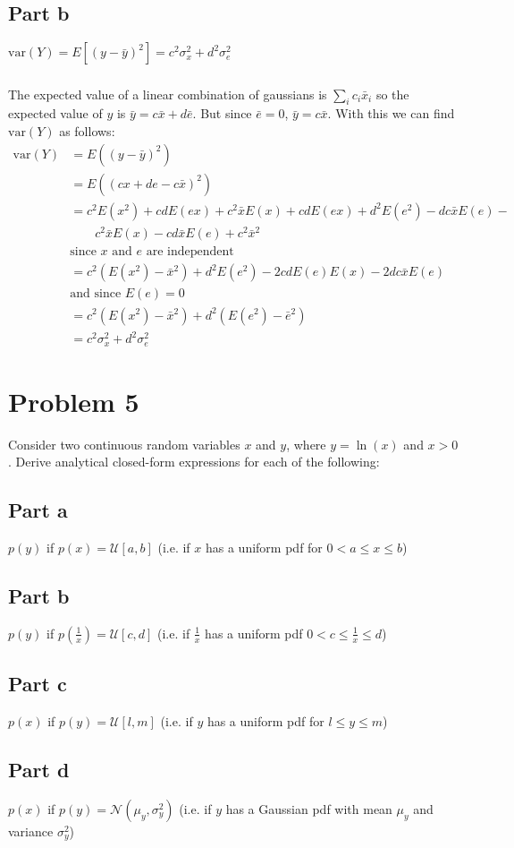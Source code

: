 \documentclass[11pt]{article}
\begin{document}
\subsection*{Part b}
$\text{var}(Y) = E[(y-\bar{y})^2]=c^2\sigma_x^2+d^2\sigma_e^2$

\subparagraph*{}
The expected value of a linear combination of gaussians is $\sum_i c_i\bar{x}_i$ so the expected value of $y$ is $\bar{y}=c\bar{x}+d\bar{e}$. But since $\bar{e}=0$, $\bar{y}=c\bar{x}$. With this we can find $\text{var}(Y)$ as follows:
\begin{align*}
	\text{var}(Y) &= E((y-\bar{y})^2) \\
	&= E((cx+de-c\bar{x})^2) \\
	&= c^2E(x^2)+cdE(ex)+c^2\bar{x}E(x)+cdE(ex)+d^2E(e^2)-dc\bar{x}E(e)-\\
	&\qquad c^2\bar{x}E(x)-cd\bar{x}E(e)+c^2\bar{x}^2 \\
	& \text{since $x$ and $e$ are independent} \\
	&= c^2(E(x^2)-\bar{x}^2)+d^2E(e^2)-2cdE(e)E(x)-2dc\bar{x}E(e)\\
	& \text{and since $E(e)=0$} \\
	&= c^2(E(x^2)-\bar x^2) + d^2(E(e^2) - \bar{e}^2) \\
	&= c^2\sigma_x^2 + d^2\sigma_e^2
\end{align*}

\section*{Problem 5}
Consider two continuous random variables $x$ and $y$, where $y=\ln(x)$ and $x>0$. Derive analytical closed-form expressions for each of the following:

\subsection*{Part a}
$p(y)$ if $p(x) = \mathcal{U}[a,b]$ (i.e. if $x$ has a uniform pdf for $0<a\leq x \leq b$)

\subsection*{Part b}
$p(y)$ if $p(\frac{1}{x})=\mathcal{U}[c,d]$ (i.e. if $\frac{1}{x}$ has a uniform pdf $0<c\leq \frac{1}{x} \leq d$)

\subsection*{Part c}
$p(x)$ if $p(y) = \mathcal{U}[l,m]$ (i.e. if $y$ has a uniform pdf for $l\leq y \leq m$)

\subsection*{Part d}
$p(x)$ if $p(y) = \mathcal{N}(\mu_y,\sigma_y^2)$ (i.e. if $y$ has a Gaussian pdf with mean $\mu_y$ and variance $\sigma_y^2$)
\end{document}
